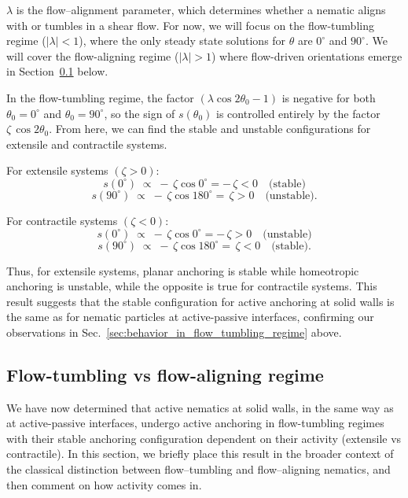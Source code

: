 \documentclass[11pt]{article}
\begin{document}
$\lambda$ is the flow–alignment parameter, which determines whether a nematic aligns with or tumbles in a shear flow. For now, we will focus on the flow-tumbling regime ($|\lambda|<1$), where the only steady state solutions for $\theta$ are $0^\circ$ and $90^\circ$. We will cover the flow-aligning regime ($|\lambda|>1$) where flow-driven orientations emerge in Section~\ref{sec:flow-tumbling-vs-flow-aligning} below.

In the flow-tumbling regime, the factor $(\lambda\cos 2\theta_0 - 1)$ is negative for both $\theta_0=0^\circ$ and $\theta_0=90^\circ$, so the sign of $s(\theta_0)$ is controlled entirely by the factor $\zeta\,\cos 2\theta_0$. From here, we can find the stable and unstable configurations for extensile and contractile systems. 

\pagebreak
For extensile systems $(\zeta>0)$:
$$s(0^\circ)\;\propto\; -\,\zeta\cos 0^\circ = -\,\zeta < 0
\quad \text{(stable)}$$
$$s(90^\circ)\;\propto\; -\,\zeta\cos 180^\circ = \,\zeta > 0
\quad \text{(unstable)}.$$

For contractile systems $(\zeta<0)$:
$$s(0^\circ)\;\propto\; -\,\zeta\cos 0^\circ = -\,\zeta > 0
\quad \text{(unstable)}$$
$$s(90^\circ)\;\propto\; -\,\zeta\cos 180^\circ = \,\zeta < 0 \quad \text{(stable)}.$$

Thus, for extensile systems, planar anchoring is stable while homeotropic anchoring is unstable, while the opposite is true for contractile systems. This result suggests that the stable configuration for active anchoring at solid walls is the same as for nematic particles at active-passive interfaces, confirming our observations in Sec.~\ref{sec:behavior_in_flow_tumbling_regime} above.

\subsection{Flow-tumbling vs flow-aligning regime}
\label{sec:flow-tumbling-vs-flow-aligning}

We have now determined that active nematics at solid walls, in the same way as at active-passive interfaces, undergo active anchoring in flow-tumbling regimes with their stable anchoring configuration dependent on their activity (extensile vs contractile). In this section, we briefly place this result in the broader context of the classical distinction between flow–tumbling and flow–aligning nematics, and then comment on how activity comes in.
\end{document}
